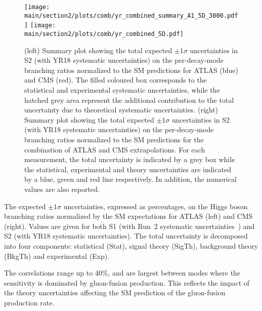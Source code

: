 \begin{figure}[hbtp]
\centering
\texttt{[image: \\main/section2/plots/comb/yr\_combined\_summary\_A1\_5D\_3000.pdf]}%
\texttt{[image: \\main/section2/plots/comb/yr\_combined\_5D.pdf]}%
\caption{(left) Summary plot showing the total expected $\pm 1\sigma$ uncertainties in S2 (with YR18 systematic uncertainties) on the  per-decay-mode branching ratios normalized to the SM predictions   for ATLAS (blue)  and CMS (red). The filled coloured box corresponds to the statistical and experimental systematic uncertainties, while the hatched grey area represent the additional contribution to the total uncertainty due to theoretical systematic uncertainties.
(right) Summary plot showing the total expected $\pm 1\sigma$  uncertainties in S2 (with YR18 systematic uncertainties) on the per-decay-mode branching ratios normalized to the SM predictions for the combination of ATLAS and CMS extrapolations. For each measurement,  the total uncertainty is indicated by a grey box while the statistical, experimental and theory uncertainties are indicated by a blue, green and red line respectively. In addition, the numerical values are also reported.}
\label{fig:summary_A1_5D}
\end{figure}


\begin{table}[hbtp]
\centering
\caption{The expected $\pm 1\sigma$ uncertainties, expressed as percentages, on the Higgs boson branching ratios normalized by the SM expectations for ATLAS (left) and CMS (right). Values are given for both S1 (with Run~2 systematic uncertainties~\cite{Sirunyan:2018koj}) and S2 (with YR18 systematic uncertainties). The total uncertainty is decomposed into four components: statistical (Stat), signal theory (SigTh), background theory (BkgTh) and experimental (Exp).}
\small
\hspace{0.5cm}

\label{tab:summary_A1_5D}
\vspace{0.5cm}
\end{table}


The correlations range up to 40\%, and are largest between modes where the sensitivity is dominated by gluon-fusion production. This reflects the impact of the theory uncertainties affecting the SM prediction of the gluon-fusion production rate.




